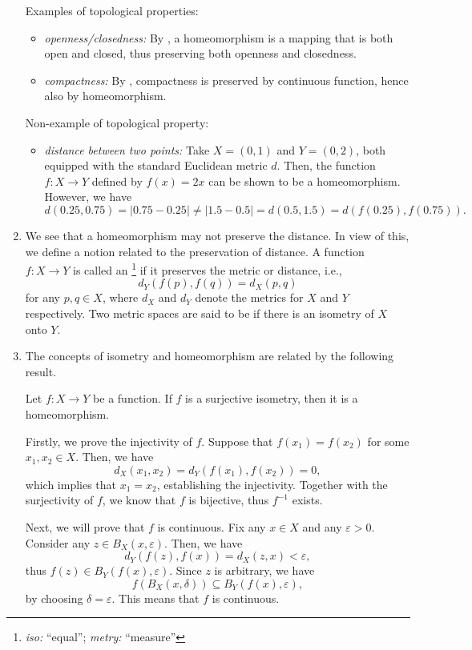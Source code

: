 \begin{enumerate}
Examples of topological properties:
\begin{itemize}
\item \emph{openness/closedness:} By , a homeomorphism is a
mapping that is both open and closed, thus preserving both openness and
closedness.
\item \emph{compactness:} By , compactness is
preserved by continuous function, hence also by homeomorphism.
\end{itemize}
Non-example of topological property:
\begin{itemize}
\item \emph{distance between two points:} Take \(X=(0,1)\) and \(Y=(0,2)\),
both equipped with the standard Euclidean metric \(d\). Then, the function
\(f:X\to Y\) defined by \(f(x)=2x\) can be shown to be a homeomorphism.
However, we have
\[
d(0.25,0.75)=|0.75-0.25|\ne |1.5-0.5|=d(0.5,1.5)=d(f(0.25),f(0.75)).
\]
\end{itemize}
\item We see that a homeomorphism may not preserve the distance. In view of
this, we define a notion related to the preservation of distance. A function
\(f:X\to Y\) is called an \footnote{\emph{iso:} ``equal'';
\emph{metry:} ``measure''} if it preserves the metric or distance, i.e.,
\[
d_Y(f(p),f(q))=d_X(p,q)
\]
for any \(p,q\in X\), where \(d_X\) and \(d_Y\) denote the metrics for \(X\)
and \(Y\) respectively. Two metric spaces are said to be  if
there is an isometry of \(X\) onto \(Y\).

\item The concepts of isometry and homeomorphism are related by the following
result.
\begin{proposition}
\label{prp:surj-iso-hmph}
Let \(f:X\to Y\) be a function. If \(f\) is a surjective isometry, then it is a
homeomorphism.
\end{proposition}
\begin{pf}
Firstly, we prove the injectivity of \(f\). Suppose that
\(f(x_1)=f(x_2)\) for some \(x_1,x_2\in X\). Then, we have
\[
d_X(x_1,x_2)=d_Y(f(x_1),f(x_2))=0,
\]
which implies that \(x_1=x_2\), establishing the injectivity. Together with the
surjectivity of \(f\), we know that \(f\) is bijective, thus \(f^{-1}\) exists.

Next, we will prove that \(f\) is continuous. Fix any \(x\in X\) and any
\(\varepsilon>0\). Consider any \(z\in B_X(x,\varepsilon)\). Then, we have
\[
d_Y(f(z),f(x))=d_X(z,x)<\varepsilon,
\]
thus \(f(z)\in B_{Y}(f(x),\varepsilon)\). Since \(z\) is arbitrary, we have
\[
f(B_X(x,\delta))\subseteq B_Y(f(x),\varepsilon),
\]
by choosing \(\delta=\varepsilon\).  This means that \(f\) is continuous.


\end{pf}
\end{enumerate}
